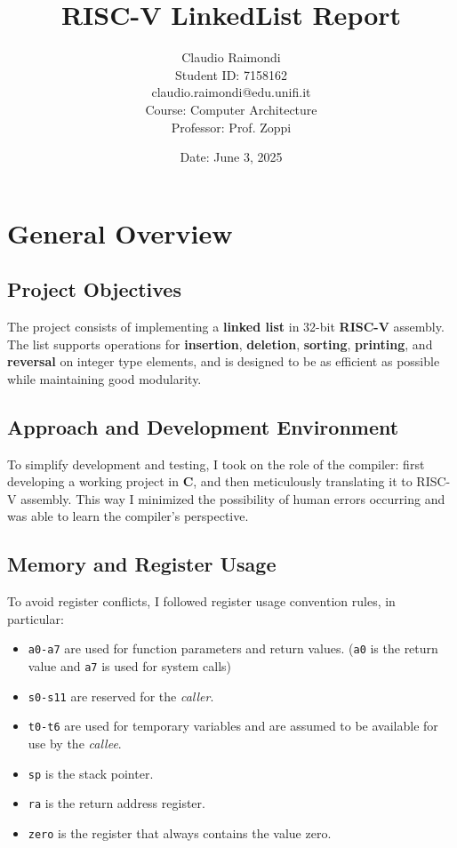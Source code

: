 \documentclass[a4paper,12pt]{article}
\title{\textbf{RISC-V LinkedList Report}}
\author{Claudio Raimondi\\Student ID: 7158162\\claudio.raimondi@edu.unifi.it\\
Course: Computer Architecture\\
Professor: Prof. Zoppi}
\date{Date: June 3, 2025}
\begin{document}
\maketitle
\tableofcontents
\thispagestyle{empty}
\newpage
\setcounter{page}{1}

\section{General Overview}

\subsection{Project Objectives}

The project consists of implementing a \textbf{linked list} in 32-bit \textbf{RISC-V} assembly. 
The list supports operations for \textbf{insertion}, \textbf{deletion}, \textbf{sorting}, \textbf{printing}, and \textbf{reversal} on integer type elements, and is designed to be as efficient as possible while maintaining good modularity.

\subsection{Approach and Development Environment}

To simplify development and testing, I took on the role of the compiler: first developing a working project in \textbf{C}, and then meticulously translating it to RISC-V assembly.
This way I minimized the possibility of human errors occurring and was able to learn the compiler's perspective.

\subsection{Memory and Register Usage}

To avoid register conflicts, I followed register usage convention rules, in particular:
\begin{itemize}
  \item \texttt{a0-a7} are used for function parameters and return values. (\texttt{a0} is the return value and \texttt{a7} is used for system calls)
  \item \texttt{s0-s11} are reserved for the \emph{caller}.
  \item \texttt{t0-t6} are used for temporary variables and are assumed to be available for use by the \emph{callee}.
  \item \texttt{sp} is the stack pointer.
  \item \texttt{ra} is the return address register.
  \item \texttt{zero} is the register that always contains the value zero.
\end{itemize}
\end{document}
